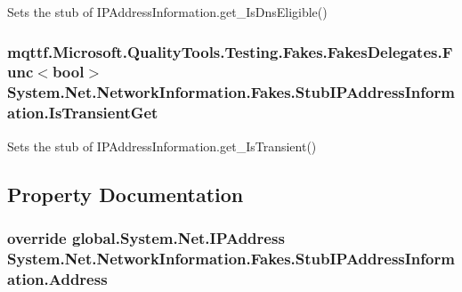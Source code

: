 Sets the stub of I\-P\-Address\-Information.\-get\-\_\-\-Is\-Dns\-Eligible()

\hypertarget{class_system_1_1_net_1_1_network_information_1_1_fakes_1_1_stub_i_p_address_information_a798738af3bd2f4a61662efe01073a1f0}{
\subsubsection[{Is\-Transient\-Get}]{\setlength{\rightskip}{0pt plus 5cm}mqttf.\-Microsoft.\-Quality\-Tools.\-Testing.\-Fakes.\-Fakes\-Delegates.\-Func$<$bool$>$ System.\-Net.\-Network\-Information.\-Fakes.\-Stub\-I\-P\-Address\-Information.\-Is\-Transient\-Get}}\label{class_system_1_1_net_1_1_network_information_1_1_fakes_1_1_stub_i_p_address_information_a798738af3bd2f4a61662efe01073a1f0}


Sets the stub of I\-P\-Address\-Information.\-get\-\_\-\-Is\-Transient()



\subsection{Property Documentation}
\hypertarget{class_system_1_1_net_1_1_network_information_1_1_fakes_1_1_stub_i_p_address_information_ab4bc8d6fd94a1bb960aaa3734c36ff66}{
\subsubsection[{Address}]{\setlength{\rightskip}{0pt plus 5cm}override global.\-System.\-Net.\-I\-P\-Address System.\-Net.\-Network\-Information.\-Fakes.\-Stub\-I\-P\-Address\-Information.\-Address\hspace{0.3cm}{\ttfamily [get]}}}\label{class_system_1_1_net_1_1_network_information_1_1_fakes_1_1_stub_i_p_address_information_ab4bc8d6fd94a1bb960aaa3734c36ff66}


